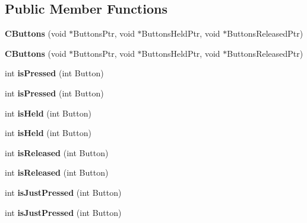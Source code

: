 \subsection*{Public Member Functions}
\begin{DoxyCompactItemize}
\item 
\hypertarget{class_c_buttons_ae5c226df45be410d158a792510af7f17}{{\bfseries C\-Buttons} (void $\ast$Buttons\-Ptr, void $\ast$Buttons\-Held\-Ptr, void $\ast$Buttons\-Released\-Ptr)}\label{class_c_buttons_ae5c226df45be410d158a792510af7f17}

\item 
\hypertarget{class_c_buttons_ae5c226df45be410d158a792510af7f17}{{\bfseries C\-Buttons} (void $\ast$Buttons\-Ptr, void $\ast$Buttons\-Held\-Ptr, void $\ast$Buttons\-Released\-Ptr)}\label{class_c_buttons_ae5c226df45be410d158a792510af7f17}

\item 
\hypertarget{class_c_button_base_a0d4758b9e756a8c3c2bb39b907ea9170}{int {\bfseries is\-Pressed} (int Button)}\label{class_c_button_base_a0d4758b9e756a8c3c2bb39b907ea9170}

\item 
\hypertarget{class_c_button_base_a0d4758b9e756a8c3c2bb39b907ea9170}{int {\bfseries is\-Pressed} (int Button)}\label{class_c_button_base_a0d4758b9e756a8c3c2bb39b907ea9170}

\item 
\hypertarget{class_c_button_base_a67e38daead9d22e33f6a3d85902d1f98}{int {\bfseries is\-Held} (int Button)}\label{class_c_button_base_a67e38daead9d22e33f6a3d85902d1f98}

\item 
\hypertarget{class_c_button_base_a67e38daead9d22e33f6a3d85902d1f98}{int {\bfseries is\-Held} (int Button)}\label{class_c_button_base_a67e38daead9d22e33f6a3d85902d1f98}

\item 
\hypertarget{class_c_button_base_a575dee487bcca1abf29c1084dfdd5bb8}{int {\bfseries is\-Released} (int Button)}\label{class_c_button_base_a575dee487bcca1abf29c1084dfdd5bb8}

\item 
\hypertarget{class_c_button_base_a575dee487bcca1abf29c1084dfdd5bb8}{int {\bfseries is\-Released} (int Button)}\label{class_c_button_base_a575dee487bcca1abf29c1084dfdd5bb8}

\item 
\hypertarget{class_c_button_base_ab74fd21217c5e379a613b7474af4f9b8}{int {\bfseries is\-Just\-Pressed} (int Button)}\label{class_c_button_base_ab74fd21217c5e379a613b7474af4f9b8}

\item 
\hypertarget{class_c_button_base_ab74fd21217c5e379a613b7474af4f9b8}{int {\bfseries is\-Just\-Pressed} (int Button)}\label{class_c_button_base_ab74fd21217c5e379a613b7474af4f9b8}

\end{DoxyCompactItemize}


